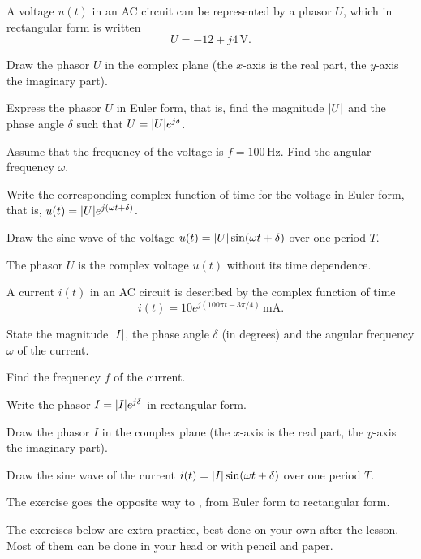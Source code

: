 
A voltage $u(t)$ in an AC circuit can be represented by a phasor $U$, which in rectangular form
is written
\[
  U = -12 + j4\,\text{V}.
\]
\begin{parts}
  \item Draw the phasor $U$ in the complex plane (the $x$-axis is the real part, the $y$-axis the
    imaginary part).
  \item Express the phasor $U$ in Euler form, that is, find the magnitude $\lvert U\rvert$ and the phase
    angle $\delta$ such that $U = \lvert U\rvert e^{j\delta}$.
  \item Assume that the frequency of the voltage is $f = 100\,\text{Hz}$. Find the angular
    frequency $\omega$.
  \item Write the corresponding complex function of time for the voltage in Euler form, that is,
    $u(t) = \lvert U\rvert e^{j(\omega t + \delta)}$.
  \item Draw the sine wave of the voltage $u(t) = \lvert U\rvert\sin(\omega t + \delta)$ over one period
    $T$.
\end{parts}
\note[Note] The phasor $U$ is the complex voltage $u(t)$ without its time dependence.

A current $i(t)$ in an AC circuit is described by the complex function of time
\[
  i(t) = 10e^{j(100\pi t - 3\pi/4)}\,\text{mA}.
\]
\begin{parts}
  \item State the magnitude $\lvert I\rvert$, the phase angle $\delta$ (in degrees) and the angular
    frequency $\omega$ of the current.
  \item Find the frequency $f$ of the current.
  \item Write the phasor $I = \lvert I\rvert e^{j\delta}$ in rectangular form.
  \item Draw the phasor $I$ in the complex plane (the $x$-axis is the real part, the $y$-axis the
    imaginary part).
  \item Draw the sine wave of the current $i(t) = \lvert I\rvert\sin(\omega t + \delta)$ over one period
    $T$.
\end{parts}
\note[Note] The exercise goes the opposite way to , from Euler form to rectangular
form.

The exercises below are extra practice, best done on your own after the lesson. Most of them can
be done in your head or with pencil and paper.

